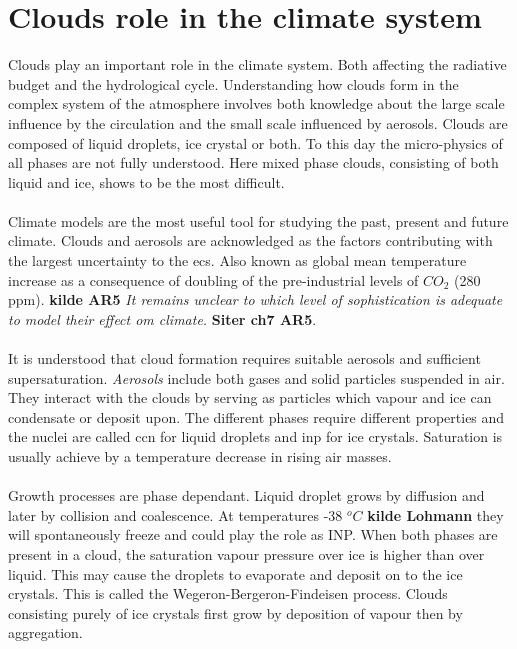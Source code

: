 \section{Clouds role in the climate system} \label{sec:cloud_in_climate_system}
Clouds play an important role in the climate system. Both affecting the radiative budget and the hydrological cycle. Understanding how clouds form in the complex system of the atmosphere involves both knowledge about the large scale influence by the circulation and the small scale influenced by aerosols. Clouds are composed of liquid droplets, ice crystal or both. To this day the micro-physics of all phases are not fully understood. Here mixed phase clouds, consisting of both liquid and ice, shows to be the most difficult. 
\\ \\ 
Climate models are the most useful tool for studying the past, present and future climate. Clouds and aerosols are acknowledged as the factors contributing with the largest uncertainty to the \acrfull{ecs}. Also known as global mean temperature increase as a consequence of doubling of the pre-industrial levels of $CO_2$ (280 \acrshort{ppm}). \textbf{kilde AR5} \textit{It remains unclear to which level of sophistication is adequate to model their effect om climate.} \textbf{Siter ch7 AR5}.
\\ \\
It is understood that cloud formation requires suitable aerosols and sufficient supersaturation. \textit{Aerosols} include both gases and solid particles suspended in air. They interact with the clouds by serving as particles which vapour and ice can condensate or deposit upon. The different phases require different properties and the nuclei are called \acrshort{ccn} for liquid droplets and \acrshort{inp} for ice crystals. Saturation is usually achieve by a temperature decrease in rising air masses. %
\\ \\ 
Growth processes are phase dependant. Liquid droplet grows by diffusion and later by collision and coalescence. At temperatures -38 $^oC$ \textbf{kilde Lohmann} they will spontaneously freeze and could play the role as INP. When both phases are present in a cloud, the saturation vapour pressure over ice is higher than over liquid. This may cause the droplets to evaporate and deposit on to the ice crystals. This is called the Wegeron-Bergeron-Findeisen process. Clouds consisting purely of ice crystals first grow by deposition of vapour then by aggregation. 
